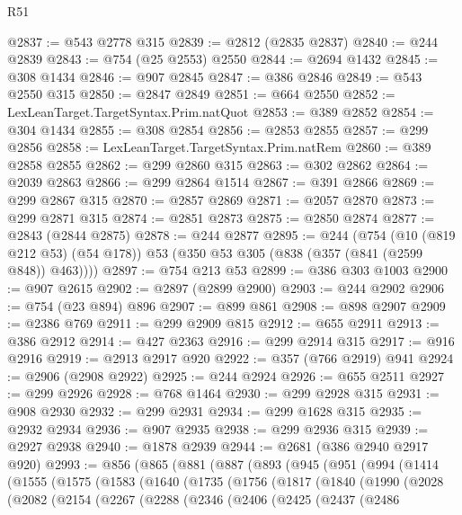 \begin{lexlean}{R51}
\begin{coremodule}
@2837 := @543 @2778 @315
@2839 := @2812 (@2835 @2837)
@2840 := @244 @2839
@2843 := @754 (@25 @2553) @2550
@2844 := @2694 @1432
@2845 := @308 @1434
@2846 := @907 @2845
@2847 := @386 @2846
@2849 := @543 @2550 @315
@2850 := @2847 @2849
@2851 := @664 @2550
@2852 := LexLeanTarget.TargetSyntax.Prim.natQuot
@2853 := @389 @2852
@2854 := @304 @1434
@2855 := @308 @2854
@2856 := @2853 @2855
@2857 := @299 @2856
@2858 := LexLeanTarget.TargetSyntax.Prim.natRem
@2860 := @389 @2858 @2855
@2862 := @299 @2860 @315
@2863 := @302 @2862
@2864 := @2039 @2863
@2866 := @299 @2864 @1514
@2867 := @391 @2866
@2869 := @299 @2867 @315
@2870 := @2857 @2869
@2871 := @2057 @2870
@2873 := @299 @2871 @315
@2874 := @2851 @2873
@2875 := @2850 @2874
@2877 := @2843 (@2844 @2875)
@2878 := @244 @2877
@2895 := @244
    (@754
      (@10 (@819 @212 @53) (@54 @178))
      @53
      (@350 @53 @305 (@838 (@357 (@841 (@2599 @848)) @463))))
@2897 := @754 @213 @53
@2899 := @386 @303 @1003
@2900 := @907 @2615
@2902 := @2897 (@2899 @2900)
@2903 := @244 @2902
@2906 := @754 (@23 @894) @896
@2907 := @899 @861
@2908 := @898 @2907
@2909 := @2386 @769
@2911 := @299 @2909 @815
@2912 := @655 @2911
@2913 := @386 @2912
@2914 := @427 @2363
@2916 := @299 @2914 @315
@2917 := @916 @2916
@2919 := @2913 @2917 @920
@2922 := @357 (@766 @2919) @941
@2924 := @2906 (@2908 @2922)
@2925 := @244 @2924
@2926 := @655 @2511
@2927 := @299 @2926
@2928 := @768 @1464
@2930 := @299 @2928 @315
@2931 := @908 @2930
@2932 := @299 @2931
@2934 := @299 @1628 @315
@2935 := @2932 @2934
@2936 := @907 @2935
@2938 := @299 @2936 @315
@2939 := @2927 @2938
@2940 := @1878 @2939
@2944 := @2681 (@386 @2940 @2917 @920)
@2993 := @856
    (@865
      (@881
        (@887
          (@893
            (@945
              (@951
                (@994
                  (@1414
                    (@1555
                      (@1575
                        (@1583
                          (@1640
                            (@1735
                              (@1756
                                (@1817
                                  (@1840
                                    (@1990
                                      (@2028
                                        (@2082
                                          (@2154
                                            (@2267
                                              (@2288
                                                (@2346
                                                  (@2406
                                                    (@2425
                                                      (@2437
                                                        (@2486

\end{coremodule}
\end{lexlean}
